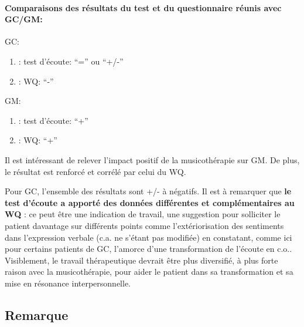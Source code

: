   \paragraph{ Comparaisons des résultats du test et du questionnaire
    réunis avec GC/GM:}


  
  GC:
  \begin{enumerate}
 		\item : test d'écoute: ``='' ou ``+/-''
 		\item : WQ: ``-''
                  
            \end{enumerate}
GM:
  \begin{enumerate}
 		\item : test d'écoute: ``+''
 		\item : WQ: ``+''
                  
               \end{enumerate}

                Il est intéressant de relever l'impact positif de la
                musicothérapie sur GM.
                De plus, le résultat est renforcé et corrélé par celui du WQ.
                

                
                Pour GC, l'ensemble des résultats sont +/- à négatifs.
Il est à remarquer que 
                 \textbf{le test d'écoute a
                apporté des données différentes et complémentaires au
                WQ} : ce peut être une indication de travail, une
              suggestion pour
              solliciter le patient davantage sur différents points
              comme l'extériorisation des sentiments dans l'expression verbale
              (c.a. ne s'étant pas modifiée)
              en constatant, comme ici pour certains patients de GC,  
                l'amorce d'une transformation de l'écoute en
                c.o.. Visiblement, le travail
                thérapeutique devrait être plus diversifié, à plus forte raison avec la musicothérapie, pour aider le
                patient dans sa transformation
               et sa mise en résonance interpersonnelle.

               \subsection{Remarque}

